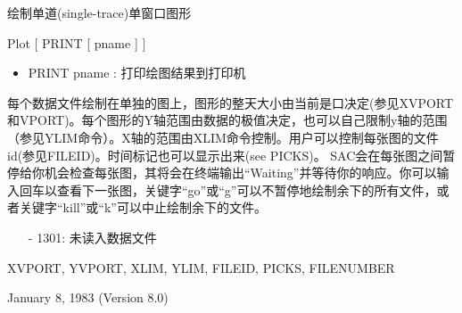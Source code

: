 \label{cmd:plot}

绘制单道(single-trace)单窗口图形

Plot [ PRINT [ pname ] ]

\begin{itemize}
\item PRINT pname : 打印绘图结果到打印机
\end{itemize}

每个数据文件绘制在单独的图上，图形的整天大小由当前是口决定(参见XVPORT和VPORT)。每个图形的Y轴范围由数据的极值决定，也可以自己限制y轴的范围（参见YLIM命令）。X轴的范围由XLIM命令控制。用户可以控制每张图的文件id(参见FILEID)。时间标记也可以显示出来(see PICKS)。
SAC会在每张图之间暂停给你机会检查每张图，其将会在终端输出``Waiting''并等待你的响应。你可以输入回车以查看下一张图，关键字``go''或``g''可以不暂停地绘制余下的所有文件，或者关键字``kill''或``k''可以中止绘制余下的文件。

\begin{itemize}
\item[-]1301: 未读入数据文件
\end{itemize}

XVPORT, YVPORT, XLIM, YLIM, FILEID, PICKS, FILENUMBER

January 8, 1983 (Version 8.0)

